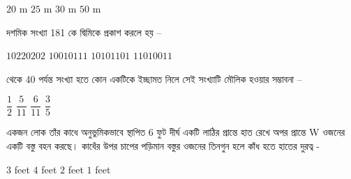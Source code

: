 \documentclass[addpoints]{exam}
\begin{document}
\begin{questions}
\begin{oneparchoices}
\choice $ 20 $ m
\choice $ 25 $ m
\choice $ 30 $ m
\choice $ 50 $ m
\end{oneparchoices}

\question  দশমিক সংখ্যা 181 কে দ্বিমিকে প্রকাশ করলে হয় – 

\begin{oneparchoices}
\choice  $ 10220202 $
\choice  $ 10010111 $
\choice  $ 10101101 $
\choice  $ 11010011 $
\end{oneparchoices}

 থেকে 40 পর্যন্ত সংখ্যা হতে কোন একটিকে ইচ্ছামত নিলে সেই সংখ্যাটি মৌলিক হওয়ার সম্ভাবনা – 

\begin{oneparchoices}
\choice $ \dfrac{1}{2} $
\choice $ \dfrac{5}{11} $
\choice $ \dfrac{6}{11} $
\choice $ \dfrac{3}{5} $
\end{oneparchoices}

\question  একজন লোক তাঁর কাধে অনুভুমিকভাবে স্থাপিত 6 ফুট দীর্ঘ একটি লাঠির প্রান্তে হাত রেখে অপর প্রান্তে W ওজনের একটি বস্তু বহন করছে। কাধেঁর উপর চাপের পড়িমান বস্তুর ওজনের তিনগুন হলে কাঁধ হতে হাতের দুরত্ব -

\begin{oneparchoices}
\choice $ 3 $ feet
\choice $ 4 $ feet
\choice $ 2 $ feet
\choice $ 1 $ feet
\end{oneparchoices}

\end{questions}
\end{document}
